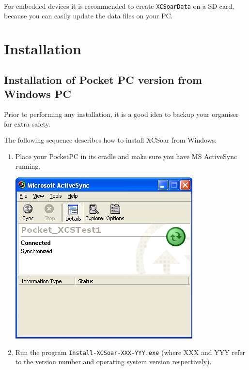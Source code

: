 \documentclass[a4paper,12pt]{refrep}
\begin{document}
For embedded devices it is recommended to create \texttt{XCSoarData} on a SD
card, because you can easily update the data files on your PC.

\section{Installation}
\subsection*{Installation of Pocket PC version from Windows PC}

Prior to performing any installation, it is a good idea to backup your
organiser for extra safety.

The following sequence describes how to install XCSoar from Windows:
\begin{enumerate}
\item Place your PocketPC in its cradle and make sure
 you have MS ActiveSync running.
\begin{center}
\includegraphics[angle=0,width=\linewidth,keepaspectratio='true']{figures/XCS_ActiveSync.png}
\end{center}

\item Run the program \verb|Install-XCSoar-XXX-YYY.exe| 
  (where XXX and YYY refer to the version number and operating system
  version respectively).


\end{enumerate}
\end{document}
